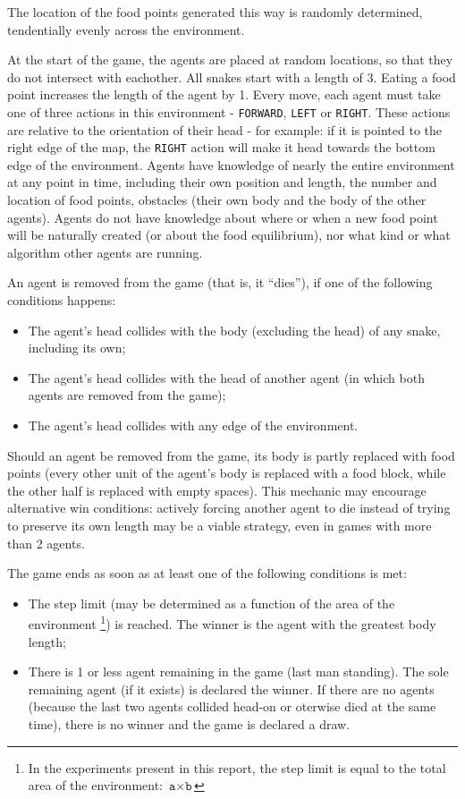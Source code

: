The location of the food points generated this way is randomly determined, tendentially evenly across the environment.

At the start of the game, the agents are placed at random locations, so that they do not intersect with eachother. All snakes start with a length of 3.
Eating a food point increases the length of the agent by 1.
Every move, each agent must take one of three actions in this environment - \texttt{FORWARD}, \texttt{LEFT} or \texttt{RIGHT}. These actions are
relative to the orientation of their head - for example: if it is
pointed to the right edge of the map, the \texttt{RIGHT} action will make
it head towards the bottom edge of the environment.
Agents have knowledge of nearly the entire environment at any point in
time, including their own position and length, the number and
location of food points, obstacles (their own body and the body of
the other agents). Agents do not have knowledge about where or when
a new food point will be naturally created (or about the food equilibrium),
nor what kind or what algorithm other agents are running.

An agent is removed from the game (that is, it “dies”), if one of the following conditions happens:

\begin{itemize}
  \item The agent's head collides with the body (excluding the head) of any snake, including its own;
  \item The agent's head collides with the head of another agent (in which both agents are removed from the game);
  \item The agent's head collides with any edge of the environment.
\end{itemize}

Should an agent be removed from the game, its body is partly replaced with food points (every other unit of the agent's body is replaced with a food block,
while the other half is replaced with empty spaces). This mechanic may encourage alternative win conditions: actively forcing another agent to die instead
of trying to preserve its own length may be a viable strategy, even in games with more than 2 agents.

The game ends as soon as at least one of the following conditions is met:
\begin{itemize}
  \item The step limit (may be determined as a function of the area of the environment
\footnote{In the experiments present in this report, the step limit is equal to the total area of the environment: $\texttt{a} \times \texttt{b}$})
  is reached. The winner is the agent with the greatest body length;
  \item There is 1 or less agent remaining in the game (last man standing). The sole remaining agent (if it exists)
  is declared the winner. If there are no agents (because the last two agents collided head-on or oterwise died at the same time),
  there is no winner and the game is declared a draw.
\end{itemize}

